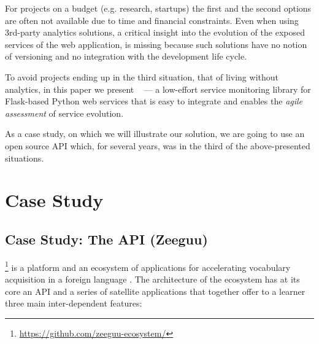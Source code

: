 
For projects on a budget (e.g. research, startups) the first and the second options are often not available due to time and financial constraints. Even when using 3rd-party analytics solutions, a critical insight into the evolution of the exposed services of the web application, is missing because such solutions have no notion of versioning and no integration with the development life cycle.~\cite{papazoglou2011managing}

To avoid projects ending up in the third situation, that of living without analytics, in this paper we present \tool~ --- a low-effort service monitoring library for Flask-based Python web services that is easy to integrate and enables the {\em agile assessment} of service evolution. \cite{Nier12b}

As a case study, on which we will illustrate our solution, we are going to use an open source API which, for several years, was in the third of the above-presented situations.





\section{Case Study}
\label{sec:case}

\subsection*{Case Study: The API (Zeeguu)}
\label{sec:api}

  \zee\footnote{\url{https://github.com/zeeguu-ecosystem/}} is a platform and an ecosystem of applications for accelerating vocabulary acquisition in a foreign language \cite{Lungu16}. 
%
  The architecture of the ecosystem has at its core an API and a series of satellite applications that together offer to a learner three main inter-dependent features:

